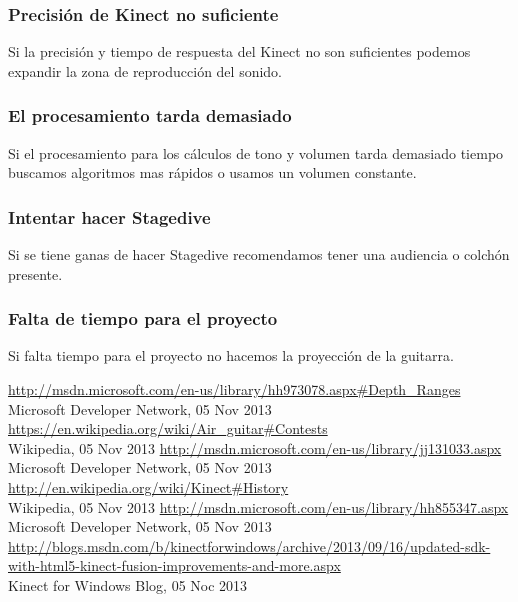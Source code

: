 \documentclass[a4paper,12pt]{article}
\begin{document}
\subsubsection{Precisión de Kinect no suficiente}
Si la precisión y tiempo de respuesta del Kinect no son suficientes podemos
expandir la zona de reproducción del sonido.
\subsubsection{El procesamiento tarda demasiado}
Si el procesamiento para los cálculos de tono y volumen tarda demasiado tiempo
buscamos algoritmos mas rápidos o usamos un volumen constante.
\subsubsection{Intentar hacer Stagedive}
Si se tiene ganas de hacer Stagedive recomendamos tener una audiencia o colchón
presente.
\subsubsection{Falta de tiempo para el proyecto}
Si falta tiempo para el proyecto no hacemos la proyección de la guitarra.

\newpage 
\appendix 
\newpage

\begin{thebibliography}{99}
\url{http://msdn.microsoft.com/en-us/library/hh973078.aspx#Depth_Ranges} \\
        Microsoft Developer Network, 05 Nov 2013
\url{https://en.wikipedia.org/wiki/Air_guitar#Contests} \\
        Wikipedia, 05 Nov 2013
\url{http://msdn.microsoft.com/en-us/library/jj131033.aspx} \\
        Microsoft Developer Network, 05 Nov 2013
\url{http://en.wikipedia.org/wiki/Kinect#History} \\
        Wikipedia, 05 Nov 2013
\url{http://msdn.microsoft.com/en-us/library/hh855347.aspx} \\
        Microsoft Developer Network, 05 Nov 2013
\url{http://blogs.msdn.com/b/kinectforwindows/archive/2013/09/16/updated-sdk-with-html5-kinect-fusion-improvements-and-more.aspx} \\
        Kinect for Windows Blog, 05 Noc 2013
\end{thebibliography}
\end{document}
